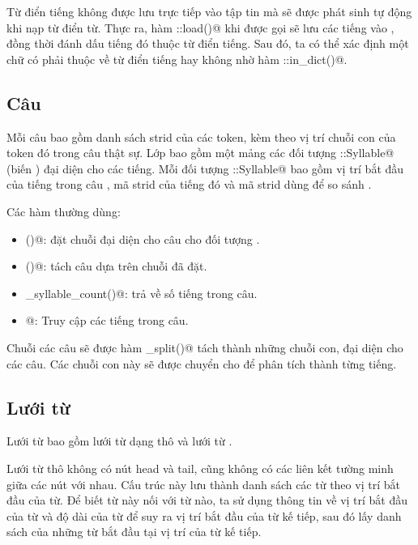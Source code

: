 \documentclass[a4paper,oneside,14pt]{extbook} %
\begin{document}
Từ điển tiếng không được lưu trực tiếp vào tập tin mà sẽ được phát
sinh tự động khi nạp từ điển từ. Thực ra, hàm \verb@WordNode::load()@
khi được gọi sẽ lưu các tiếng vào \verb@StringArchive@, đồng thời đánh
dấu tiếng đó thuộc từ điển tiếng. Sau đó, ta có thể xác định một chữ
có phải thuộc về từ điển tiếng hay không nhờ hàm
\verb@StringArchive::in_dict()@.


\subsection{Câu}

Mỗi câu bao gồm danh sách strid của các token, kèm theo vị trí chuỗi
con của token đó trong câu thật sự. Lớp \verb@Sentence@ bao gồm một
mảng các đối tượng \verb@Sentence::Syllable@ (biến \verb@syllables@) đại diện cho các
tiếng. Mỗi đối tượng \verb@Sentence::Syllable@ bao gồm vị trí bắt đầu
của tiếng trong câu \verb@start@, mã strid của tiếng đó \verb@id@ và
mã strid dùng để so sánh \verb@cid@.

Các hàm thường dùng:
\begin{itemize}
\item \verb@set()@: đặt chuỗi đại diện cho câu cho đối tượng
  \verb@Sentence@. 
\item \verb@tokenize()@: tách câu dựa trên chuỗi đã đặt.
\item \verb@get_syllable_count()@: trả về số tiếng trong câu.
\item \verb@operator[]@: Truy cập các tiếng trong câu.
\end{itemize}

Chuỗi các câu sẽ được hàm \verb@sentences_split()@ tách thành những
chuỗi con, đại diện cho các câu. Các chuỗi con này sẽ được chuyển cho
\verb@Sentence@ để phân tích thành từng tiếng.

\subsection{Lưới từ}

Lưới từ bao gồm lưới từ dạng thô \verb@Lattice@ và lưới từ \verb@DAG@.

Lưới từ thô \verb@Lattice@ không có nút head và tail, cũng không có các
liên kết tường minh giữa các nút với nhau. Cấu trúc này lưu thành danh
sách các từ theo vị trí bắt đầu của từ. Để biết từ này nối với từ nào,
ta sử dụng thông tin về vị trí bắt đầu của từ và độ dài của từ để suy
ra vị trí bắt đầu của từ kế tiếp, sau đó lấy danh sách của những từ
bắt đầu tại vị trí của từ kế tiếp.
\end{document}
